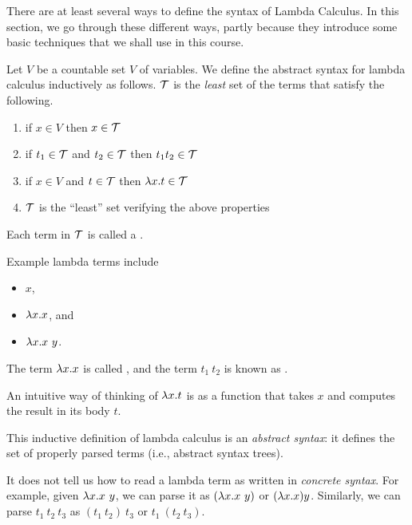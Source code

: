 There are at least several ways to define the syntax of Lambda Calculus.
%
In this section, we go through these different ways, partly because they introduce some basic techniques that we shall use in this course.  

\begin{definition}
\label{def:lcs::syn::inductive}
Let $V$ be a countable set $V$ of variables.  We define the abstract
syntax for lambda calculus inductively as follows.
%
$\mathcal{T}$ is the {\em least} set of the terms that satisfy the following.
\begin{enumerate}
\item{if $x\in V$ then $x\in {\cal T}$}
\item{if $t_1\in {\cal T}$ and $t_2\in {\cal T}$ then $t_1t_2\in {\cal T}$}
\item{if $x\in V$ and $t\in {\cal T}$ then $\lambda   x.t\in {\cal T}$}
\item{${\cal T}$ is the ``least'' set verifying the above properties}
\end{enumerate}

Each term in $\mathcal{T}$ is called a .  
\end{definition}

\begin{example}
\label{xrcs:lcs::syn::1} 
Example lambda terms include
\begin{itemize}
\item $x$,
\item $\lambda x.x$, and
\item $\lambda x.x~y$.  
\end{itemize}
\end{example}

\begin{definition}
\label{def:lcs::syn::abstraction}
The term $\lambda x.x$ is called ,
%
and the term $t_1~t_2$ is known as .
%

An intuitive way of thinking of $\lambda x.t$ is as a function that takes
$x$ and computes the result in its body $t$.
\end{definition}

\begin{gram}
\label{grm:lcs::syn::abs-and-conc} 
This inductive definition of lambda calculus is an \emph{abstract syntax}:
%
it defines the set of properly parsed terms (i.e., abstract syntax
trees).  
%

It does not tell us how to read a lambda term as written in
\emph{concrete syntax}.  
%
For example, given $\lambda x. x~y$, we can parse it as 
$(\lambda x.x~y)$ or $(\lambda x. x) y$.  
%
Similarly, we can parse $t_1~t_2~t_3$ as
$(t_1~t_2)~t_3$ or $t_1~(t_2~t_3)$.
\end{gram}

